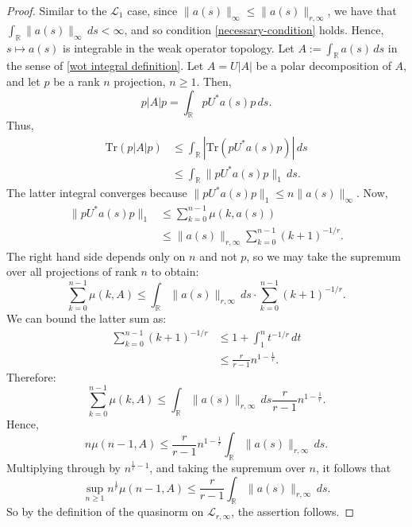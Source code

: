     \begin{proof}
        Similar to the $\mathcal{L}_{1}$ case, since $\|a(s)\|_{\infty} \leq \|a(s)\|_{r,\infty}$, we have that $\int_{\mathbb{R}} \|a(s)\|_{\infty}\,ds < \infty$,
        and so condition \eqref{necessary-condition} holds. Hence, $s\mapsto a(s)$ is integrable in the weak operator topology. Let $A := \int_{\mathbb{R}} a(s)\,ds$ { in the sense of \eqref{wot integral definition}}. Let $A = U|A|$ be a polar decomposition of $A$, and let $p$ be a rank $n$ projection, $n\geq 1$. Then,
        \begin{equation*}
            p|A|p = \int_{\mathbb{R}} pU^*a(s)p\,ds.
        \end{equation*}
        Thus,
        \begin{align*}
            \mathrm{Tr}(p|A|p) &\leq \int_{\mathbb{R}} |\mathrm{Tr}(pU^*a(s)p)|\,ds\\
                       &\leq \int_{\mathbb{R}} \|pU^*a(s)p\|_1\,ds.
        \end{align*}
        The latter integral converges because $\|pU^*a(s)p\|_1 \leq n\|a(s)\|_\infty$. Now,
        \begin{align*}
            \|pU^*a(s)p\|_1 &\leq \sum_{k=0}^{n-1} \mu(k,a(s))\\
                            &\leq \|a(s)\|_{r,\infty} \sum_{k=0}^{n-1} (k+1)^{-1/r}.
        \end{align*}
        The right hand side depends only on $n$ and not $p$, so we may take the supremum
        over all projections of rank $n$ to obtain:
        \begin{equation*}
            \sum_{k=0}^{n-1} \mu(k,A) \leq \int_{\mathbb{R}} \|a(s)\|_{r,\infty}\,ds\cdot \sum_{k=0}^{n-1} (k+1)^{-1/r}.
        \end{equation*}
        We can bound the latter sum as:
        \begin{align*}
            \sum_{k=0}^{n-1} (k+1)^{-1/r} &\leq 1+\int_1^n t^{-1/r}\,dt\\
                                          &\leq \frac{r}{r-1} n^{1-\frac{1}{r}}.
        \end{align*}
        Therefore:
        \begin{equation*}
            \sum_{k=0}^{n-1} \mu(k,A) \leq \int_{\mathbb{R}} \|a(s)\|_{r,\infty}\,ds \frac{r}{r-1}n^{1-\frac{1}{r}}.
        \end{equation*}
        Hence,
        \begin{equation*}
            n\mu(n-1,A) \leq \frac{r}{r-1}n^{1-\frac{1}{r}}\int_{\mathbb{R}} \|a(s)\|_{r,\infty}\,ds.
        \end{equation*}
        Multiplying through by $n^{\frac{1}{r}-1}$, and taking the supremum over $n$, it follows that
        \begin{equation*}
            \sup_{n\geq 1} n^{\frac{1}{r}}\mu(n-1,A) \leq \frac{r}{r-1}\int_{\mathbb{R}} \|a(s)\|_{r,\infty}\,ds.
        \end{equation*}
        So by the definition of the quasinorm on $\mathcal{L}_{r,\infty}$, the assertion follows.
\end{proof}


